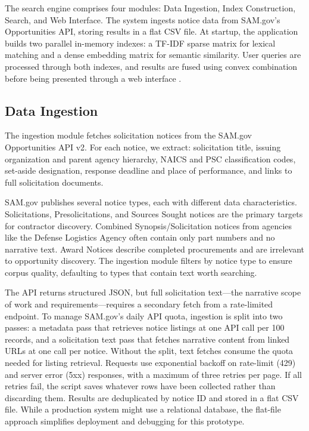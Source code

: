 \documentclass[10pt,twocolumn]{article}
\begin{document}
The search engine comprises four modules: Data Ingestion, Index Construction, Search, and Web Interface. The system ingests notice data from SAM.gov's Opportunities API, storing results in a flat CSV file. At startup, the application builds two parallel in-memory indexes: a TF-IDF sparse matrix for lexical matching and a dense embedding matrix for semantic similarity. User queries are processed through both indexes, and results are fused using convex combination before being presented through a web interface \cite{ElasticHybrid}.

\subsection{Data Ingestion}

The ingestion module fetches solicitation notices from the SAM.gov Opportunities API v2. For each notice, we extract: solicitation title, issuing organization and parent agency hierarchy, NAICS and PSC classification codes, set-aside designation, response deadline and place of performance, and links to full solicitation documents.

SAM.gov publishes several notice types, each with different data characteristics. Solicitations, Presolicitations, and Sources Sought notices are the primary targets for contractor discovery. Combined Synopsis/Solicitation notices from agencies like the Defense Logistics Agency often contain only part numbers and no narrative text. Award Notices describe completed procurements and are irrelevant to opportunity discovery. The ingestion module filters by notice type to ensure corpus quality, defaulting to types that contain text worth searching.

The API returns structured JSON, but full solicitation text---the narrative scope of work and requirements---requires a secondary fetch from a rate-limited endpoint. To manage SAM.gov's daily API quota, ingestion is split into two passes: a metadata pass that retrieves notice listings at one API call per 100 records, and a solicitation text pass that fetches narrative content from linked URLs at one call per notice. Without the split, text fetches consume the quota needed for listing retrieval. Requests use exponential backoff on rate-limit (429) and server error (5xx) responses, with a maximum of three retries per page. If all retries fail, the script saves whatever rows have been collected rather than discarding them. Results are deduplicated by notice ID and stored in a flat CSV file. While a production system might use a relational database, the flat-file approach simplifies deployment and debugging for this prototype.
\end{document}
